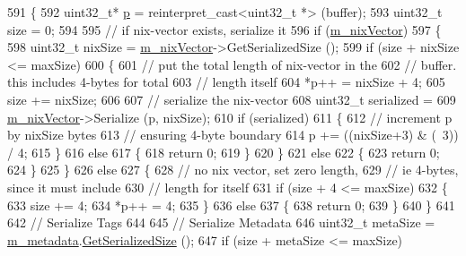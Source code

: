 \begin{DoxyCode}
591 \{
592   uint32\_t* \hyperlink{lte__link__budget_8m_ac9de518908a968428863f829398a4e62}{p} = \textcolor{keyword}{reinterpret\_cast<}uint32\_t *\textcolor{keyword}{>} (buffer);
593   uint32\_t size = 0;
594 
595   \textcolor{comment}{// if nix-vector exists, serialize it}
596   \textcolor{keywordflow}{if} (\hyperlink{classns3_1_1Packet_af6fe17f2fb778ccd84af5c3c950ee4f4}{m\_nixVector})
597     \{
598       uint32\_t nixSize = \hyperlink{classns3_1_1Packet_af6fe17f2fb778ccd84af5c3c950ee4f4}{m\_nixVector}->GetSerializedSize ();
599       \textcolor{keywordflow}{if} (size + nixSize <= maxSize)
600         \{
601           \textcolor{comment}{// put the total length of nix-vector in the}
602           \textcolor{comment}{// buffer. this includes 4-bytes for total }
603           \textcolor{comment}{// length itself}
604           *p++ = nixSize + 4;
605           size += nixSize;
606 
607           \textcolor{comment}{// serialize the nix-vector}
608           uint32\_t serialized = 
609             \hyperlink{classns3_1_1Packet_af6fe17f2fb778ccd84af5c3c950ee4f4}{m\_nixVector}->Serialize (p, nixSize);
610           \textcolor{keywordflow}{if} (serialized)
611             \{
612               \textcolor{comment}{// increment p by nixSize bytes}
613               \textcolor{comment}{// ensuring 4-byte boundary}
614               p += ((nixSize+3) & (~3)) / 4;
615             \}
616           \textcolor{keywordflow}{else}
617             \{
618               \textcolor{keywordflow}{return} 0;
619             \}
620         \}
621       \textcolor{keywordflow}{else} 
622         \{
623           \textcolor{keywordflow}{return} 0;
624         \}
625     \}
626   \textcolor{keywordflow}{else}
627     \{ 
628       \textcolor{comment}{// no nix vector, set zero length, }
629       \textcolor{comment}{// ie 4-bytes, since it must include }
630       \textcolor{comment}{// length for itself}
631       \textcolor{keywordflow}{if} (size + 4 <= maxSize)
632         \{
633           size += 4;
634           *p++ = 4;
635         \}
636       \textcolor{keywordflow}{else}
637         \{
638           \textcolor{keywordflow}{return} 0;
639         \}
640     \}
641 
642   \textcolor{comment}{// Serialize Tags}
644 \textcolor{comment}{}
645   \textcolor{comment}{// Serialize Metadata}
646   uint32\_t metaSize = \hyperlink{classns3_1_1Packet_af3f95fba7966191bd152bcedd5fbcd6b}{m\_metadata}.\hyperlink{classns3_1_1PacketMetadata_a8d399798f5b18fc287a772914bfd9386}{GetSerializedSize} ();
647   \textcolor{keywordflow}{if} (size + metaSize <= maxSize)

\end{DoxyCode}
